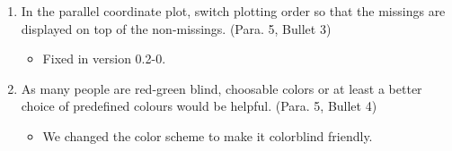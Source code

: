 \documentclass[12pt,english]{article}
\begin{document}
\begin{enumerate}
\item In the parallel coordinate plot, switch plotting order so that the
missings are displayed on top of the non-missings. (Para. 5, Bullet
3)
\begin{itemize}
\item Fixed in version 0.2-0.
\end{itemize}

\item As many people are red-green blind, choosable colors or at least a
better choice of predefined colours would be helpful. (Para. 5, Bullet
4)
\begin{itemize}
\item We changed the color scheme to make it colorblind friendly.
\end{itemize}

\end{enumerate}
\end{document}
